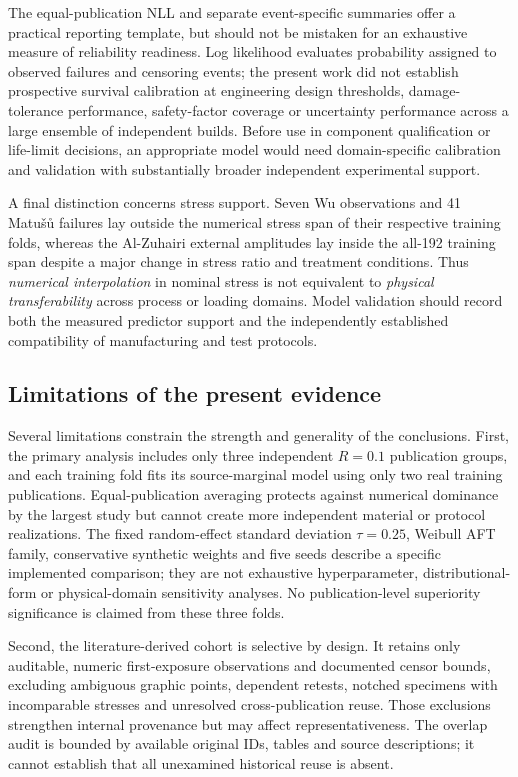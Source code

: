 \documentclass[12pt,a4paper]{article}
\begin{document}
The equal-publication NLL and separate event-specific summaries offer a practical reporting template, but should not be mistaken for an exhaustive measure of reliability readiness. Log likelihood evaluates probability assigned to observed failures and censoring events; the present work did not establish prospective survival calibration at engineering design thresholds, damage-tolerance performance, safety-factor coverage or uncertainty performance across a large ensemble of independent builds. Before use in component qualification or life-limit decisions, an appropriate model would need domain-specific calibration and validation with substantially broader independent experimental support.

A final distinction concerns stress support. Seven Wu observations and 41 Matušů failures lay outside the numerical stress span of their respective training folds, whereas the Al-Zuhairi external amplitudes lay inside the all-192 training span despite a major change in stress ratio and treatment conditions. Thus \emph{numerical interpolation} in nominal stress is not equivalent to \emph{physical transferability} across process or loading domains. Model validation should record both the measured predictor support and the independently established compatibility of manufacturing and test protocols.

\subsection{Limitations of the present evidence}

Several limitations constrain the strength and generality of the conclusions. First, the primary analysis includes only three independent \(R=0.1\) publication groups, and each training fold fits its source-marginal model using only two real training publications. Equal-publication averaging protects against numerical dominance by the largest study but cannot create more independent material or protocol realizations. The fixed random-effect standard deviation \(\tau=0.25\), Weibull AFT family, conservative synthetic weights and five seeds describe a specific implemented comparison; they are not exhaustive hyperparameter, distributional-form or physical-domain sensitivity analyses. No publication-level superiority significance is claimed from these three folds.

Second, the literature-derived cohort is selective by design. It retains only auditable, numeric first-exposure observations and documented censor bounds, excluding ambiguous graphic points, dependent retests, notched specimens with incomparable stresses and unresolved cross-publication reuse. Those exclusions strengthen internal provenance but may affect representativeness. The overlap audit is bounded by available original IDs, tables and source descriptions; it cannot establish that all unexamined historical reuse is absent.
\end{document}
